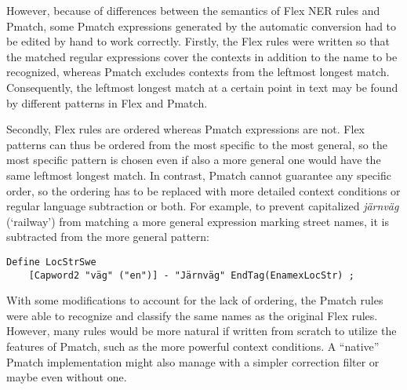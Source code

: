 \documentclass{llncs}
\begin{document}
However, because of differences between the semantics of Flex NER
rules and Pmatch, some Pmatch expressions generated by the automatic
conversion had to be edited by hand to work correctly. Firstly, the
Flex rules were written so that the matched regular expressions cover
the contexts in addition to the name to be recognized, whereas Pmatch
excludes contexts from the leftmost longest match. Consequently, the
leftmost longest match at a certain point in text may be found by
different patterns in Flex and Pmatch.


Secondly, Flex rules are ordered whereas Pmatch expressions are not.
Flex patterns can thus be ordered from the most
specific to the most general, so the most specific pattern is
chosen even if also a more general one would have the same
leftmost longest match. In contrast,
Pmatch cannot guarantee any specific order, so the ordering has to be
replaced with more detailed context conditions or regular language
subtraction or both. For example, to prevent capitalized
\textit{järnväg} (`railway') from matching a more general expression
marking street names, it is subtracted from the more general pattern:
%
\begin{verbatim}
Define LocStrSwe
    [Capword2 "väg" ("en")] - "Järnväg" EndTag(EnamexLocStr) ;
\end{verbatim}

With some modifications to account for the lack of ordering, the
Pmatch rules were able to recognize and classify the same names as the
original Flex rules. However, many rules would be more natural if
written from scratch to utilize the features of Pmatch, such as the
more powerful context conditions. A ``native'' Pmatch implementation
might also manage with a simpler correction filter or maybe even
without one.
\end{document}
